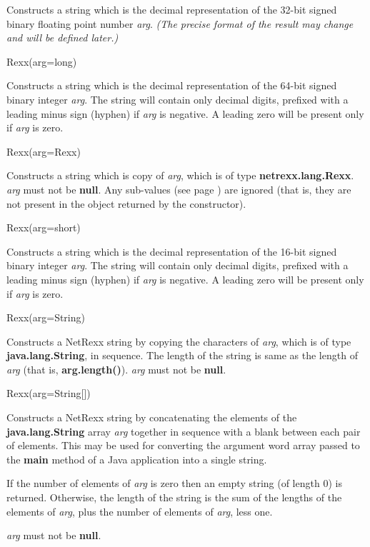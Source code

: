 \begin{description}
Constructs a string which is the decimal representation of
the 32-bit signed binary floating point number \emph{arg}.
 \emph{(The precise format of the result may change and
will be defined later.)}
\item{Rexx(arg=long)}

Constructs a string which is the decimal representation of
the 64-bit signed binary integer \emph{arg}.
The string will contain only decimal digits, prefixed with a
leading minus sign (hyphen) if \emph{arg} is negative.
A leading zero will be present only if \emph{arg} is zero.
\item{Rexx(arg=Rexx)}

Constructs a string which is copy of \emph{arg}, which is of
type \textbf{netrexx.lang.Rexx}.
\emph{arg} must not be \textbf{null}.
Any  sub-values (see page \pageref{refinstr})  are ignored (that is, they are not present in
the object returned by the constructor).
\item{Rexx(arg=short)}

Constructs a string which is the decimal representation of
the 16-bit signed binary integer \emph{arg}.
The string will contain only decimal digits, prefixed with a
leading minus sign (hyphen) if \emph{arg} is negative.
A leading zero will be present only if \emph{arg} is zero.
\item{Rexx(arg=String)}

Constructs a NetRexx string by copying the characters of \emph{arg},
which is of type \textbf{java.lang.String}, in sequence.
The length of the string is same as the length of \emph{arg}
(that is, \textbf{arg.length()}).
\emph{arg} must not be \textbf{null}.
\item{Rexx(arg=String[])}

Constructs a NetRexx string by concatenating the elements of
the \textbf{java.lang.String} array \emph{arg} together in
sequence with a blank between each pair of elements.
This may be used for converting the argument word array passed to
the \textbf{main} method of a Java application into a single string.
 
If the number of elements of \emph{arg} is zero then an empty string
(of length 0) is returned.  Otherwise, the length of the string is the
sum of the lengths of the elements of \emph{arg}, plus the number of
elements of \emph{arg}, less one.
 
\emph{arg} must not be \textbf{null}.
\end{description}
